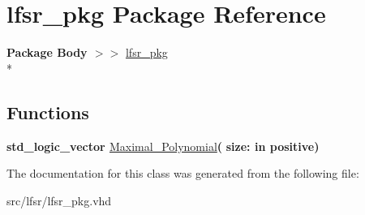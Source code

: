 \hypertarget{classlfsr__pkg}{\section{lfsr\-\_\-pkg Package Reference}
\label{classlfsr__pkg}
}
{\bfseries Package Body $>$$>$ }\hyperlink{class__lfsr__pkg}{lfsr\-\_\-pkg}\\*
\subsection*{Functions}
 \begin{DoxyCompactItemize}
\item 
\hypertarget{classlfsr__pkg_aa892d93dafd63bb0a40765dec3e73940}{{\bfseries {\bfseries \textcolor{comment}{std\-\_\-logic\-\_\-vector}\textcolor{vhdlchar}{ }}} \hyperlink{classlfsr__pkg_aa892d93dafd63bb0a40765dec3e73940}{Maximal\-\_\-\-Polynomial}{\bfseries  ( }{\bfseries \textcolor{vhdlchar}{size\-: }\textcolor{stringliteral}{in }\textcolor{vhdlchar}{positive}}{\bfseries  )} }\label{classlfsr__pkg_aa892d93dafd63bb0a40765dec3e73940}

\end{DoxyCompactItemize}


The documentation for this class was generated from the following file\-:\begin{DoxyCompactItemize}
\item 
src/lfsr/lfsr\-\_\-pkg.\-vhd\end{DoxyCompactItemize}
